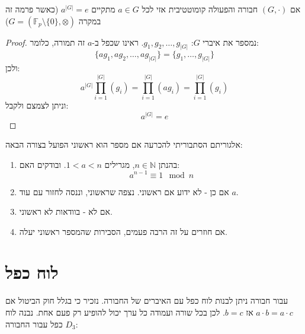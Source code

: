 \documentclass{tstextbook}
\begin{document}
\begin{theorem}
אם \((G,\cdot)\) חבורה והפעולה קומוטטיבית אזי לכל \(a\in G\) מתקיים \(a^{|G|}=e\) (כאשר פרמה זה במקרה \(G=(\mathbb{F}_{p}\setminus \{ 0 \},\otimes)\))

\end{theorem}
\begin{proof}
נמספר את איברי \(G\): \(g_{1},g_{2},\dots,g_{|G|}\). 
ראינו שכפל ב-\(a\) זה תמורה, כלומר:
$$\{ ag_{1},ag_{2},\dots,ag_{|G|} \}=\{ g_{1},\dots,g_{|G|} \}$$
ולכן:
$$a^{|G|}\prod_{i=1}^{|G|}(g_{i})=\prod_{i=1}^{|G|}(ag_{i})=\prod_{i=1}^{|G|}(g_{i})$$
וניתן לצמצם ולקבל:
$$a^{|G|}=e$$

\end{proof}
\begin{proposition}
אלגוריתם הסתבוריתי להכרעה אם מספר הוא ראשוני הפועל בצורה הבאה:

  \begin{enumerate}
    \item בהנתן \(n\in \mathbb{N}\), מגרילים \(1<a<n\). ובודקים האם: 
$$a^{n-1} \equiv 1\mod n$$


    \item אם כן - לא ידוע אם ראשוני. נצפה שראשוני, וננסה לחזור עם עוד \(a\). 


    \item אם לא - בוודאות לא ראשוני. 


    \item אם חוזרים על זה הרבה פעמים, הסבירות שהמספר ראשוני יעלה.  


  \end{enumerate}
\end{proposition}
\section{לוח כפל}

עבור חבורה ניתן לבנות לוח כפל עם האיברים של החבורה. נזכיר כי בגלל חוק הביטול אם \(a\cdot b=a\cdot c\) אז \(b=c\). לכן בכל שורה ועמודה כל ערך יכול להופיע רק פעם אחת. נבנה לוח כפל עבור החבורה \(D_{3}\):
\end{document}
